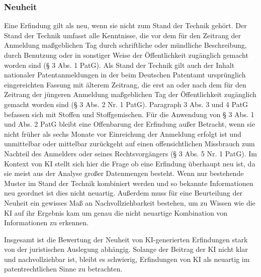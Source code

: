 \subsubsection{Neuheit}
Eine Erfindung gilt als neu, wenn sie nicht zum Stand der Technik gehört. 
Der Stand der Technik umfasst alle Kenntnisse, 
die vor dem für den Zeitrang der Anmeldung
maßgeblichen Tag durch schriftliche 
oder mündliche Beschreibung, durch Benutzung oder in
sonstiger Weise der Öffentlichkeit zugänglich gemacht worden sind (§ 3 Abs. 1 PatG).
Als Stand der Technik gilt auch der Inhalt nationaler Patentanmeldungen 
in der beim Deutschen
Patentamt ursprünglich eingereichten Fassung mit älterem Zeitrang, 
die erst an oder nach dem für
den Zeitrang der jüngeren Anmeldung maßgeblichen Tag der Öffentlichkeit 
zugänglich gemacht
worden sind (§ 3 Abs. 2 Nr. 1 PatG). 
Paragraph 3 Abs. 3 und 4 PatG befassen sich mit Stoffen und Stoffgemischen. 
Für die Anwendung von § 3 Abs. 1 und Abs. 2 PatG bleibt 
eine Offenbarung der Erfindung außer Betracht, 
wenn sie nicht früher als sechs Monate vor Einreichung der Anmeldung erfolgt ist und
unmittelbar oder mittelbar zurückgeht 
auf einen offensichtlichen Missbrauch zum Nachteil des
Anmelders oder seines Rechtsvorgängers (§ 3 Abs. 5 Nr. 1 PatG).
Im Kontext von KI stellt sich hier die Frage ob eine Erfindung überhaupt neu ist,
da sie meist aus der Analyse großer Datenmengen besteht. Wenn nur 
bestehende Muster im Stand der Technik kombiniert werden 
und so bekannte Informationen neu geordnet ist dies nicht neuartig.
Außerdem muss für eine Beurteilung der Neuheit ein gewisses Maß an 
Nachvollziehbarkeit bestehen, 
um zu Wissen wie die KI auf ihr Ergebnis kam um genau die nicht neuartige 
Kombination von Informationen zu erkennen.




Insgesamt ist die Bewertung der Neuheit von KI-generierten Erfindungen 
stark von der juristischen Auslegung abhängig. 
Solange der Beitrag der KI nicht klar und nachvollziehbar ist, 
bleibt es schwierig, 
Erfindungen von KI als neuartig im patentrechtlichen Sinne zu betrachten.
\\
